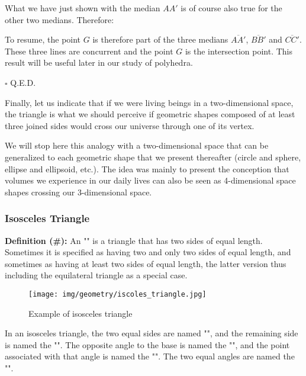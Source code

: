 {\begin{theorem}
\begin{enumerate}
\begin{dem}
		What we have just shown with the median $AA'$ is of course also true for the other two medians. Therefore:
		
		To resume, the point $G$ is therefore part of the three medians $\overline{AA'}$, $\overline{BB'}$ and $\overline{CC'}$. These three lines are concurrent and the point $G$ is the intersection point. This result will be useful later in our study of polyhedra.
		\begin{flushright}
			$\square$  Q.E.D.
		\end{flushright}
		\end{dem}
	\end{enumerate}
	\end{theorem}
	Finally, let us indicate that if we were living beings in a two-dimensional space, the triangle is what we should perceive if geometric shapes composed of at least three joined sides would cross our universe through one of its vertex.
	
	We will stop here this analogy with a two-dimensional space that can be generalized to each geometric shape that we present thereafter (circle and sphere, ellipse and ellipsoid, etc.). The idea was mainly to present the conception that volumes we experience in our daily lives can also be seen as 4-dimensional space shapes crossing our 3-dimensional space.
	
	\subsubsection{Isosceles Triangle}
	\textbf{Definition (\#\mydef):} An "" is a triangle that has two sides of equal length. Sometimes it is specified as having two and only two sides of equal length, and sometimes as having at least two sides of equal length, the latter version thus including the equilateral triangle as a special case.
	
	\begin{figure}[H]
		\centering
		\texttt{[image: img/geometry/iscoles\_triangle.jpg]}
		\caption{Example of isosceles triangle}
	\end{figure}
	In an isosceles triangle, the two equal sides are named "", and the remaining side is named the "". The opposite angle to the base is named the "", and the point associated with that angle is named the "". The two equal angles are named the "".
	
}
